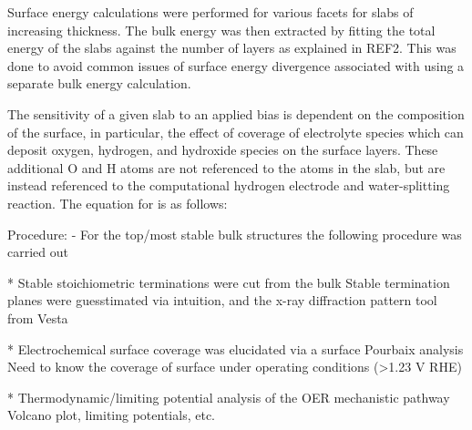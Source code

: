 Surface energy calculations were performed for various facets for slabs of increasing thickness.
The bulk energy was then extracted by fitting the total energy of the slabs against the number of layers as explained in REF2.
This was  done to avoid common issues of surface energy divergence associated with using a separate bulk energy calculation.

The sensitivity of a given slab to an applied bias is dependent on the composition of the surface,
in particular, the effect of coverage of electrolyte species which can deposit oxygen, hydrogen, and hydroxide species on the surface layers.
These additional O and H atoms are not referenced to the atoms in the slab, but are instead referenced to the computational hydrogen electrode and water-splitting reaction.
The equation for is as follows:






Procedure:
- For the top/most stable bulk structures the following procedure was carried out

* Stable stoichiometric terminations were cut from the bulk Stable termination planes were guesstimated via intuition, and the x-ray diffraction pattern tool from Vesta

* Electrochemical surface coverage was elucidated via a surface Pourbaix analysis Need to know the coverage of surface under operating conditions (>1.23 V RHE)

* Thermodynamic/limiting potential analysis of the OER mechanistic pathway Volcano plot, limiting potentials, etc.

